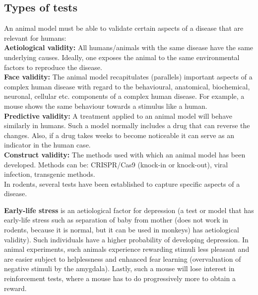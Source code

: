 \documentclass[twosided, a4paper, pt11]{article}
\begin{document}
	\subsection{Types of tests}
	An animal model must be able to validate certain aspects of a disease that are relevant for humans:\\
	\textbf{Aetiological validity: }All humans/animals with the same disease have the same underlying causes. Ideally, one exposes the animal to the same environmental factors to reproduce the disease. \\
	\textbf{Face validity: }The animal model recapitulates (parallels) important aspects of a complex human disease with regard to the behavioural, anatomical, biochemical, neuronal, cellular etc. components of a complex human disease. For example, a mouse shows the same behaviour towards a stimulus like a human. \\
	\textbf{Predictive validity: }A treatment applied to an animal model will behave similarly in humans. Such a model normally includes a drug that can reverse the changes. Also, if a drug takes weeks to become noticeable it can serve as an indicator in the human case. \\
	\textbf{Construct validity: }The methods used with which an animal model has been developed. Methods can be: CRISPR/Cas9 (knock-in or knock-out), viral infection, transgenic methods. \\
	In rodents, several tests have been established to capture specific aspects of a disease.\newline
	
	\textbf{Early-life stress} is an aetiological factor for depression (a test or model that has early-life stress such as separation of baby from mother (does not work in rodents, because it is normal, but it can be used in monkeys) has aetiological validity). Such individuals have a higher probability of developing depression. In animal experiments, such animals experience rewarding stimuli less pleasant and are easier subject to helplessness and enhanced fear learning (overvaluation of negative stimuli by the amygdala). Lastly, such a mouse will lose interest in reinforcement tests, where a mouse has to do progressively more to obtain a reward.
	
\end{document}
